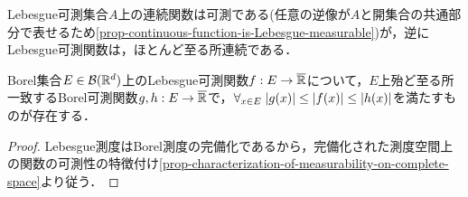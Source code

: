 \documentclass[uplatex, dvipdfmx]{jsreport}
\begin{document}
\begin{tcolorbox}[colframe=ForestGreen, colback=ForestGreen!10!white,breakable,colbacktitle=ForestGreen!40!white,coltitle=black,fonttitle=\bfseries\sffamily,
    title=]
    Lebesgue可測集合$A$上の連続関数は可測である(任意の逆像が$A$と開集合の共通部分で表せるため\ref{prop-continuous-function-is-Lebesgue-measurable})が，逆にLebesgue可測関数は，ほとんど至る所連続である．
\end{tcolorbox}
    

\begin{theorem}\label{thm-Lebesgue-measurability-in-terms-of-Borel-measurability}
    Borel集合$E\in\mathcal{B}(\mathbb{R}^d)$上のLebesgue可測関数$f:E\to\overline{\mathbb{R}}$について，$E$上殆ど至る所一致するBorel可測関数$g,h:E\to\overline{\mathbb{R}}$で，$\forall_{x\in E}\;\lvert g(x)\rvert\le\lvert f(x)\rvert\le\lvert h(x)\rvert$を満たすものが存在する．
\end{theorem}
\begin{proof}
    Lebesgue測度はBorel測度の完備化であるから，完備化された測度空間上の関数の可測性の特徴付け\ref{prop-characterization-of-measurability-on-complete-space}より従う．
\end{proof}
\end{document}
